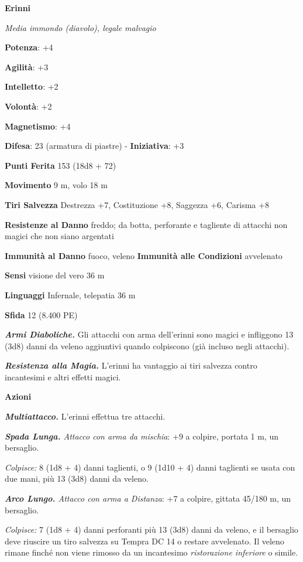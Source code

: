 \begin{multicols}{2}
\textbf{Erinni}

\emph{Media immondo (diavolo), legale malvagio}

\textbf{Potenza}: +4

\textbf{Agilità}: +3

\textbf{Intelletto}: +2

\textbf{Volontà}: +2

\textbf{Magnetismo}: +4

\textbf{Difesa}: 23 (armatura di piastre) - \textbf{Iniziativa}: +3

\textbf{Punti Ferita} 153 (18d8 + 72)

\textbf{Movimento} 9 m, volo 18 m

\textbf{Tiri Salvezza} Destrezza +7, Costituzione +8, Saggezza +6,
Carisma +8

\textbf{Resistenze al Danno} freddo; da botta, perforante e tagliente
di attacchi non magici che non siano argentati

\textbf{Immunità al Danno} fuoco, veleno \textbf{Immunità alle
Condizioni} avvelenato

\textbf{Sensi} visione del vero 36 m

\textbf{Linguaggi} Infernale, telepatia 36 m 

\textbf{Sfida} 12 (8.400 PE)\smallskip

\emph{\textbf{Armi Diaboliche.}} Gli attacchi con arma dell'erinni sono
magici e infliggono 13 (3d8) danni da veleno aggiuntivi quando
colpiscono (già incluso negli attacchi).

\emph{\textbf{Resistenza alla Magia.}} L'erinni ha vantaggio ai tiri
salvezza contro incantesimi e altri effetti magici.

\smallskip\textbf{Azioni}

\emph{\textbf{Multiattacco.}} L'erinni effettua tre attacchi.

\emph{\textbf{Spada Lunga.} Attacco con arma da mischia}: +9 a colpire,
portata 1 m, un bersaglio.

\emph{Colpisce:} 8 (1d8 + 4) danni taglienti, o 9 (1d10 + 4) danni
taglienti se usata con due mani, più 13 (3d8) danni da veleno.

\emph{\textbf{Arco Lungo.} Attacco con arma a Distanza}: +7 a colpire,
gittata 45/180 m, un bersaglio.

\emph{Colpisce:} 7 (1d8 + 4) danni perforanti più 13 (3d8) danni da
veleno, e il bersaglio deve riuscire un tiro salvezza su Tempra DC
14 o restare avvelenato. Il veleno rimane finché non viene rimosso da un
incantesimo \emph{ristorazione inferiore} o simile.


\end{multicols}
